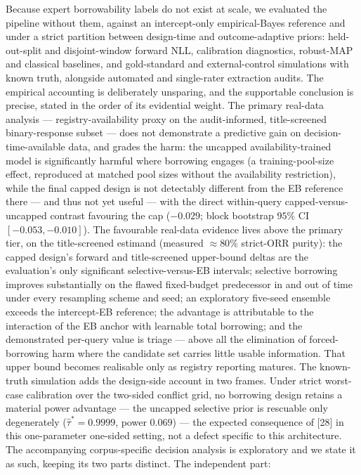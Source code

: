 \documentclass[11pt]{article}
\begin{document}
Because expert borrowability labels do not exist at scale, we evaluated the
pipeline without them, against an intercept-only empirical-Bayes reference and
under a strict partition between design-time and outcome-adaptive priors:
held-out-split and disjoint-window forward NLL, calibration diagnostics,
robust-MAP and classical baselines, and gold-standard and external-control
simulations with known truth, alongside automated and single-rater extraction
audits. The
empirical accounting is deliberately unsparing, and the supportable
conclusion is precise, stated in the order of its evidential weight. The
primary real-data analysis --- registry-availability proxy on the
audit-informed, title-screened binary-response subset --- does not
demonstrate a
predictive gain on decision-time-available data, and grades the harm: the
uncapped availability-trained model is significantly harmful where borrowing
engages (a training-pool-size effect, reproduced at matched pool sizes
without the availability restriction), while the final capped design is
not detectably different from the EB reference there --- and thus not
yet useful --- with the direct within-query capped-versus-uncapped
contrast favouring the cap ($-0.029$; block bootstrap $95\%$ CI
$[-0.053,-0.010]$). The favourable
real-data
evidence lives above the primary tier, on the title-screened estimand
(measured $\approx 80\%$ strict-ORR purity): the capped design's forward
and title-screened upper-bound deltas are the evaluation's only significant
selective-versus-EB intervals; selective borrowing improves substantially
on the flawed fixed-budget predecessor in and out of time under every
resampling scheme and seed; an exploratory five-seed ensemble exceeds the
intercept-EB reference; the advantage is attributable to the interaction of
the EB anchor with learnable total borrowing; and the demonstrated
per-query value is triage --- above all the elimination of forced-borrowing
harm where the candidate set carries little usable information. That upper
bound becomes realisable only as registry reporting matures. The
known-truth simulation adds the design-side account in two frames. Under
strict worst-case calibration over the two-sided conflict grid, no
borrowing design retains a material power advantage --- the uncapped
selective prior is rescuable only degenerately ($\hat\tau^{*} = 0.9999$,
power $0.069$) --- the expected consequence of [28] in this one-parameter
one-sided setting, not a defect specific to this architecture. The
accompanying corpus-specific decision analysis is exploratory and we state
it as such, keeping its two parts distinct. The independent part:
\end{document}
